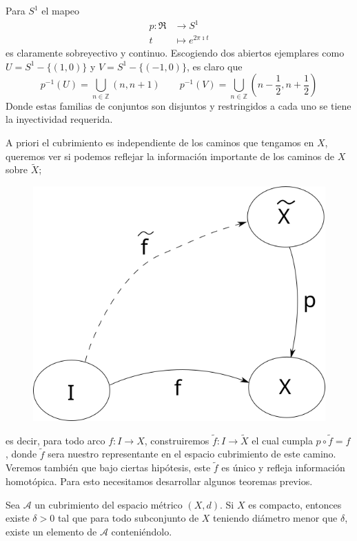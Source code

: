 \begin{ejemplo}
Para \(S^1\) el mapeo
\begin{align*}
  p : \Re &\longrightarrow S^1 \\
  t &\longmapsto e^{2 \pi \imath t}
\end{align*}
es claramente
sobreyectivo y continuo. Escogiendo dos abiertos ejemplares como \(U =
S^1 - \{(1,0)\}\) y \(V = S^1 - \{(-1,0)\}\), es claro que
\[
    p^{-1} (U) = \bigcup_{n \in \mathbb Z} (n, n+1)
    \qquad p^{-1} (V) = \bigcup_{n \in \mathbb Z} (n - \frac 1 2, n + \frac 1
    2 )
\]
Donde estas familias de conjuntos son disjuntos y restringidos a cada
uno se tiene la inyectividad requerida.
\end{ejemplo}

A priori el cubrimiento es independiente de los caminos que tengamos
en \(X\), queremos ver si podemos reflejar la información importante de
los caminos de \(X\) sobre \(\tilde{X}\);
\begin{figure}[h]
  \centering
  \includegraphics[scale=0.3]{./imagenes/lifting-path.png}
\end{figure}
es decir, para todo arco \(f : I \to X\), construiremos \(\tilde f : I
\to \tilde X\) el cual cumpla \(p \circ \tilde f = f \), donde \(\tilde
f\) sera nuestro representante en el espacio cubrimiento de este
camino. Veremos también que bajo ciertas hipótesis, este \(\tilde f\)
es único y refleja información homotópica. Para esto necesitamos
desarrollar algunos teoremas previos.
\begin{lema} \label{lem:lebesgue-number-lema}
  Sea \(\mathcal A\) un cubrimiento del espacio métrico \((X,d)\). Si
  \(X\) es compacto, entonces existe \(\delta > 0\) tal que para todo
  subconjunto de \(X\) teniendo diámetro menor que \(\delta\), existe un
  elemento de \(\mathcal A\) conteniéndolo.
\end{lema}
